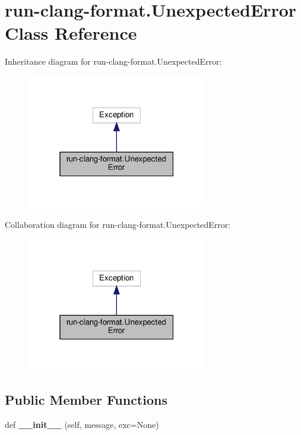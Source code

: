 \hypertarget{classrun-clang-format_1_1UnexpectedError}{}\section{run-\/clang-\/format.Unexpected\+Error Class Reference}
\label{classrun-clang-format_1_1UnexpectedError}


Inheritance diagram for run-\/clang-\/format.Unexpected\+Error\+:
\nopagebreak
\begin{figure}[H]
\begin{center}
\leavevmode
\includegraphics[width=223pt]{classrun-clang-format_1_1UnexpectedError__inherit__graph}
\end{center}
\end{figure}


Collaboration diagram for run-\/clang-\/format.Unexpected\+Error\+:
\nopagebreak
\begin{figure}[H]
\begin{center}
\leavevmode
\includegraphics[width=223pt]{classrun-clang-format_1_1UnexpectedError__coll__graph}
\end{center}
\end{figure}
\subsection*{Public Member Functions}
\begin{DoxyCompactItemize}
\item 
\mbox{\label{classrun-clang-format_1_1UnexpectedError_a863bf76241df3068e6d9eee22e546a79}} 
def {\bfseries \+\_\+\+\_\+init\+\_\+\+\_\+} (self, message, exc=None)
\end{DoxyCompactItemize}
